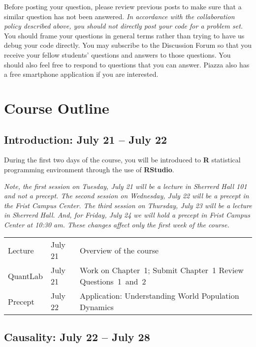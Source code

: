 \documentclass[11pt,letterpaper]{article}
\newcommand\R{\textsf{\textbf{R}}}
\newcommand\Rst{\textsf{\textbf{RStudio}}}
\begin{document}
Before posting your question, please review previous posts to make
sure that a similar question has not been answered.  {\it In
  accordance with the collaboration policy described above, you should
  not directly post your code for a problem set.}  You should frame
your questions in general terms rather than trying to have us debug
your code directly.  You may subscribe to the Discussion Forum so that
you receive your fellow students' questions and answers to those
questions.  You should also feel free to respond to questions that you
can answer.  Piazza also has a free smartphone application if you are
interested.


\section*{Course Outline}

\subsection*{Introduction: July 21 -- July 22}

During the first two days of the course, you will be introduced to
\R{} statistical programming environment through the use of \Rst.

\textit{Note, the first session on Tuesday, July 21 will be a lecture
  in Sherrerd Hall 101 and not a precept. The second session on
  Wednesday, July 22 will be a precept in the Frist Campus Center. The
  third session on Thursday, July 23 will be a lecture in Sherrerd
  Hall. And, for Friday, July 24 we will hold a precept in Frist
  Campus Center at 10:30 am. These changes affect only the first week of the
  course.}

\begin{center}
  \begin{tabular}{lll}
    \hline
    Lecture & July 21 & Overview of the course \\
    QuantLab & July 21 & Work on Chapter~1; Submit Chapter~1 Review Questions~1~and~2 \\
    Precept & July 22 & Application: Understanding World Population Dynamics\\
    \hline
  \end{tabular}
\end{center}

\bigskip 
\subsection*{Causality:  July 22 -- July 28}
\end{document}
